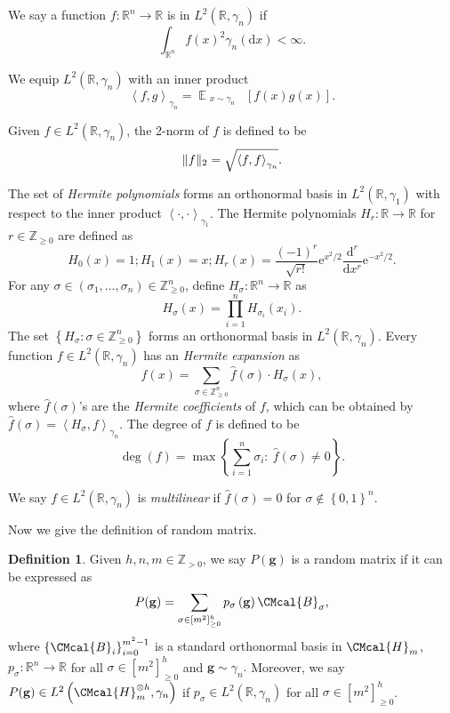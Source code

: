 \documentclass[10pt,a4paper]{article}
\def\B{\CMcal{B}}
\def\H{\CMcal{H}}
\theoremstyle{plain}
\theoremstyle{definition}
\newtheorem{definition}[theorem]{Definition}
\newcommand {\minusspace} {\: \! \!}
\newcommand {\Fn} [2] {\ensuremath{ #1 \minusspace \Br{ #2 } }}
\newcommand{\reals}{{\mathbb R}}
\newcommand {\set} [1] {\ensuremath{ \left\lbrace #1 \right\rbrace }}
\newcommand {\innerproduct} [2] {\ensuremath{\left \langle #1 , #2 \right \rangle}}
\newcommand {\br} [1] {\ensuremath{ \left( #1 \right) }}
\newcommand {\Br} [1] {\ensuremath{ \left[ #1 \right] }}
\DeclarePairedDelimiter{\norm}{\lVert}{\rVert}
\newcommand {\normsub} [2] {\ensuremath{ \norm{#1}_{#2} }}
\newcommand {\twonorm} [1] {\normsub{#1}{2}}
\DeclareMathOperator*{\bigE}{\mathbb{E}}
\newcommand {\expec} [2] {\Fn{\bigE_{\substack{#1}}}{#2}}
\newcommand{\posint}{{\mathbb Z}_{>0}}
\newcommand{\e}{\mathrm{e}}
\renewcommand{\d}{\mathrm{d}}
\newcommand{\randg}{\ensuremath{\mathbf{g}}}
\newcommand{\1}{\mathbb{1}} %
\begin{document}
We say a function $f:\reals^n\rightarrow\reals$ is in $L^2\br{\reals,\gamma_n}$ if
\[\int_{\reals^n}f(x)^2\gamma_n\br{\d x}<\infty.\]

We equip $L^2\br{\reals,\gamma_n}$ with an inner product
\[\innerproduct{f}{g}_{\gamma_n}=\expec{x\sim\gamma_n}{f(x)g(x)}.\]

Given $f\in L^2\br{\reals,\gamma_n}$, the 2-norm of $f$ is defined to be
\[\twonorm{f}=\sqrt{\innerproduct{f}{f}_{\gamma_n}}.\]

     The set of {\em Hermite polynomials} forms an orthonormal basis in $L^2\br{\reals,\gamma_1}$ with respect to the inner product $\innerproduct{\cdot}{\cdot}_{\gamma_1}$. The Hermite polynomials $H_r:\reals\rightarrow\reals$ for $r\in\mathbb{Z}_{\geq 0}$ are defined as
	\begin{equation*}%
	H_0\br{x}=1; H_1\br{x}=x; H_r\br{x}=\frac{(-1)^r}{\sqrt{r!}}\e^{x^2/2}\frac{\d^r}{\d x^r}\e^{-x^2/2}.
	\end{equation*}
	For any $\sigma\in\br{\sigma_1,\ldots,\sigma_n}\in\mathbb{Z}_{\geq 0}^n$, define
	$H_{\sigma}:\reals^n\rightarrow\reals$ as \begin{equation*}%
	H_{\sigma}\br{x}=\prod_{i=1}^nH_{\sigma_i}\br{x_i}.
	\end{equation*}
	The set $\set{H_{\sigma}:\sigma\in\mathbb{Z}_{\geq 0}^n}$ forms an orthonormal basis in $L^2\br{\reals,\gamma_n}$. Every function $f\in L^2\br{\reals,\gamma_n}$ has an {\em Hermite expansion}  as
$$f\br{x}=\sum_{\sigma\in\mathbb{Z}_{\geq 0}^n}\widehat{f}\br{\sigma}\cdot H_{\sigma}\br{x},$$
	where $\widehat{f}\br{\sigma}$'s are the {\em Hermite coefficients} of $f$, which can be obtained by $\widehat{f}\br{\sigma}=\innerproduct{H_{\sigma}}{f}_{\gamma_n}$. The degree of $f$ is defined to be \[\deg\br{f}=\max\set{\sum_{i=1}^n\sigma_i:~\widehat{f}\br{\sigma}\neq 0}.\]

We say $f\in L^2\br{\reals,\gamma_n}$ is {\em multilinear} if $\widehat{f}\br{\sigma}=0$ for $\sigma\notin\set{0,1}^n$.

Now we give the definition of random matrix.
\begin{definition}\label{def:randomoperators}
		Given $h, n, m\in\posint$, we say $P(\randg)$ is a random matrix if it can be expressed as
		\begin{equation}\label{eqn:randomoperatorexpansion}
		P(\randg)=\sum_{\sigma\in[m^2]_{\geq 0}^h}p_{\sigma}\br{\mathbf{g}}\B_{\sigma},
		\end{equation}
 		where $\set{\B_i}_{i=0}^{m^2-1}$ is a standard orthonormal basis in $\H_m$, $p_{\sigma}:\reals^n\rightarrow\reals$ for all $\sigma\in[m^2]_{\geq 0}^h$ and $\mathbf{g}\sim \gamma_n.$ Moreover, we say $P(\randg)\in L^2\br{\H_m^{\otimes h},\gamma_n}$ if $p_{\sigma}\in L^2\br{\reals,\gamma_n}$ for all $\sigma\in[m^2]_{\geq 0}^h$.
	\end{definition}
\end{document}
